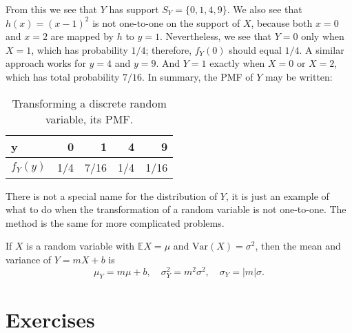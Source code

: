 From this we see that \(Y\) has support \(S_{Y}=\{0,1,4,9\}\). We also
see that \(h(x)=(x-1)^{2}\) is not one-to-one on the support of \(X\),
because both \(x=0\) and \(x=2\) are mapped by \(h\) to
\(y=1\). Nevertheless, we see that \(Y=0\) only when \(X=1\), which
has probability \(1/4\); therefore, \(f_{Y}(0)\) should equal
\(1/4\). A similar approach works for \(y=4\) and \(y=9\). And \(Y=1\)
exactly when \(X=0\) or \(X=2\), which has total probability
\(7/16\). In summary, the PMF of \(Y\) may be written:

\begin{table}[htb]
\caption[Transforming discrete random variable: PMF]{\label{tab-disc-transf-pmf}Transforming a discrete random variable, its PMF.}
\centering
\begin{tabular}{lrrrr}
y & 0 & 1 & 4 & 9\\
\hline
\(f_{Y}(y)\) & 1/4 & 7/16 & 1/4 & 1/16\\
\end{tabular}
\end{table}

There is not a special name for the distribution of \(Y\), it is just
an example of what to do when the transformation of a random variable
is not one-to-one. The method is the same for more complicated
problems.


\begin{prop}
If \(X\) is a random variable with \(\mathbb{E} X=\mu\) and \(\mbox{Var}(X)=\sigma^{2}\), then the mean and variance of \(Y=mX+b\) is
\begin{equation}
\mu_{Y}=m\mu+b,\quad \sigma_{Y}^{2}=m^{2}\sigma^{2},\quad \sigma_{Y}=|m|\sigma.
\end{equation}
\end{prop}

\newpage{}

\section{Exercises}
\label{sec-5-8}
\setcounter{thm}{0}

